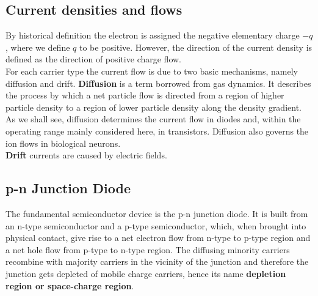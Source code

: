 \documentclass[main]{subfiles}
\begin{document}
\subsection{Current densities and flows}
By historical definition the electron is assigned the negative elementary charge \(-q\) , where we define \(q\) to be positive. However, the direction of the current density is defined as the direction of positive charge flow.\\ For each carrier type the current flow is due to two basic mechanisms, namely diffusion and drift.
\textbf{Diffusion} is a term borrowed from gas dynamics. It describes the process by which a net particle flow is directed from a region of higher particle density to a region of lower particle density along the density gradient. As we shall see, diffusion determines the current flow in diodes and, within the operating range mainly considered here, in transistors. Diffusion also governs the ion flows in biological neurons.\\
\textbf{Drift} currents are caused by electric fields.

\subsection{p-n Junction Diode}
The fundamental semiconductor device is the p-n junction diode. It is built from an n-type semiconductor and a p-type semiconductor, which, when brought into physical contact, give rise to a net electron flow from n-type to p-type region and a net hole flow from p-type to n-type region. The diffusing minority carriers recombine with majority carriers in the vicinity of the junction and therefore the junction gets depleted of mobile charge carriers, hence its name \textbf{depletion region or space-charge region}. 
\end{document}
